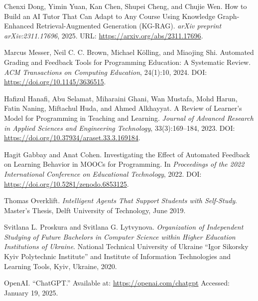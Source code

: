 \documentclass{article}
\begin{document}
\begin{thebibliography}{99}

    Chenxi Dong, Yimin Yuan, Kan Chen, Shupei Cheng, and Chujie Wen.
    \newblock How to Build an AI Tutor That Can Adapt to Any Course Using Knowledge Graph-Enhanced Retrieval-Augmented Generation (KG-RAG).
    \newblock \textit{arXiv preprint arXiv:2311.17696}, 2025.
    \newblock URL: \url{https://arxiv.org/abs/2311.17696}.
    
    Marcus Messer, Neil C. C. Brown, Michael Kölling, and Miaojing Shi.
    \newblock Automated Grading and Feedback Tools for Programming Education: A Systematic Review.
    \newblock \textit{ACM Transactions on Computing Education}, 24(1):10, 2024.
    \newblock DOI: \url{https://doi.org/10.1145/3636515}.
    
    Hafizul Hanafi, Abu Selamat, Miharaini Ghani, Wan Mustafa, Mohd Harun, Fatin Naning, Miftachul Huda, and Ahmed Alkhayyat.
    \newblock A Review of Learner’s Model for Programming in Teaching and Learning.
    \newblock \textit{Journal of Advanced Research in Applied Sciences and Engineering Technology}, 33(3):169--184, 2023.
    \newblock DOI: \url{https://doi.org/10.37934/araset.33.3.169184}.
    
    Hagit Gabbay and Anat Cohen.
    \newblock Investigating the Effect of Automated Feedback on Learning Behavior in MOOCs for Programming.
    \newblock In \textit{Proceedings of the 2022 International Conference on Educational Technology}, 2022.
    \newblock DOI: \url{https://doi.org/10.5281/zenodo.6853125}.

    Thomas Overklift. 
    \textit{Intelligent Agents That Support Students with Self-Study}. 
    Master's Thesis, Delft University of Technology, June 2019.

    Svitlana L. Proskura and Svitlana G. Lytvynova. 
    \textit{Organization of Independent Studying of Future Bachelors in Computer Science within Higher Education Institutions of Ukraine}. 
    National Technical University of Ukraine “Igor Sikorsky Kyiv Polytechnic Institute” and Institute of Information Technologies and Learning Tools, Kyiv, Ukraine, 2020.

    OpenAI. ``ChatGPT.'' Available at: \url{https://openai.com/chatgpt} Accessed: January 19, 2025.
    
\end{thebibliography}
\end{document}
